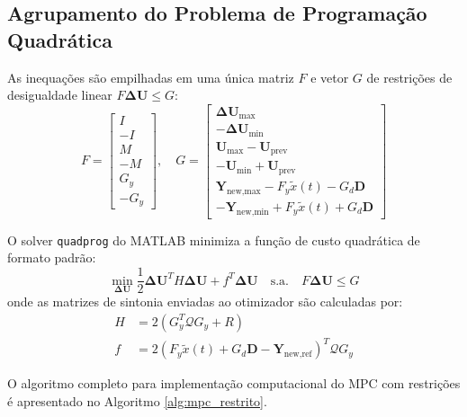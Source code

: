 \documentclass[12pt]{article}
\begin{document}
\subsection{Agrupamento do Problema de Programação Quadrática}

As inequações são empilhadas em uma única matriz $F$ e vetor $G$ de restrições de desigualdade linear $F \bm{\Delta U} \le G$:
\begin{equation}
F = \begin{bmatrix} I \\ -I \\ M \\ -M \\ G_y \\ -G_y \end{bmatrix}, \quad
G = \begin{bmatrix} 
\bm{\Delta U}_{\text{max}} \\ 
-\bm{\Delta U}_{\text{min}} \\ 
\bm{U}_{\text{max}} - \bm{U}_{\text{prev}} \\ 
-\bm{U}_{\text{min}} + \bm{U}_{\text{prev}} \\ 
\bm{Y}_{\text{new,max}} - F_y \tilde{x}(t) - G_d \bm{D} \\ 
-\bm{Y}_{\text{new,min}} + F_y \tilde{x}(t) + G_d \bm{D} 
\end{bmatrix}
\end{equation}

O solver \texttt{quadprog} do MATLAB minimiza a função de custo quadrática de formato padrão:
\begin{equation}
\min_{\bm{\Delta U}} \frac{1}{2} \bm{\Delta U}^T H \bm{\Delta U} + f^T \bm{\Delta U} \quad \text{s.a.} \quad F \bm{\Delta U} \le G
\end{equation}
onde as matrizes de sintonia enviadas ao otimizador são calculadas por:
\begin{align}
\label{eq:matrizes_qp_matlab}
H &= 2(G_y^T \mathcal{Q} G_y + R) \\
f &= 2(F_y \tilde{x}(t) + G_d \bm{D} - \bm{Y}_{\text{new,ref}})^T \mathcal{Q} G_y
\end{align}

O algoritmo completo para implementação computacional do MPC com restrições é apresentado no Algoritmo \ref{alg:mpc_restrito}.
\end{document}

